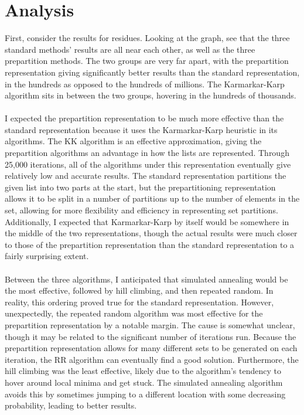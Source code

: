 \documentclass[11pt]{article}
\begin{document}
\section{\textbf{Analysis}}
First, consider the results for residues. Looking at the graph, see that the three standard methods’ results are all near each other, as well as the three prepartition methods. The two groups are very far apart, with the prepartition representation giving significantly better results than the standard representation, in the hundreds as opposed to the hundreds of millions. The Karmarkar-Karp algorithm sits in between the two groups, hovering in the hundreds of thousands. \\\\

I expected the prepartition representation to be much more effective than the standard representation because it uses the Karmarkar-Karp heuristic in its algorithms. The KK
algorithm is an effective approximation, giving the prepartition algorithms an advantage in how the lists are represented. Through 25,000 iterations, all of the algorithms under this representation eventually give relatively low and accurate results. The standard representation partitions the given list into two parts at the start, but the prepartitioning representation allows it to be split in a number of partitions up to the number of elements in the set, allowing for more flexibility and efficiency in representing set partitions. Additionally, I expected that Karmarkar-Karp by itself would be somewhere in the middle of the two representations, though the actual results were much closer to those of the prepartition representation than the standard representation to a fairly surprising extent. \\\\

Between the three algorithms, I anticipated that simulated annealing would be the most effective, followed by hill climbing, and then repeated random. In reality, this ordering proved true for the standard representation. However, unexpectedly, the repeated random algorithm was most effective for the prepartition representation by a notable margin. The cause is somewhat unclear, though it may be related to the significant number of iterations run. Because the prepartition representation allows for many different sets to be generated on each iteration, the RR algorithm can eventually find a good solution. Furthermore, the hill climbing was the least effective,
likely due to the algorithm’s tendency to hover around local minima and get stuck. The simulated annealing algorithm avoids this by sometimes jumping to a different location with some decreasing probability, leading to better results. \\\\
\end{document}
